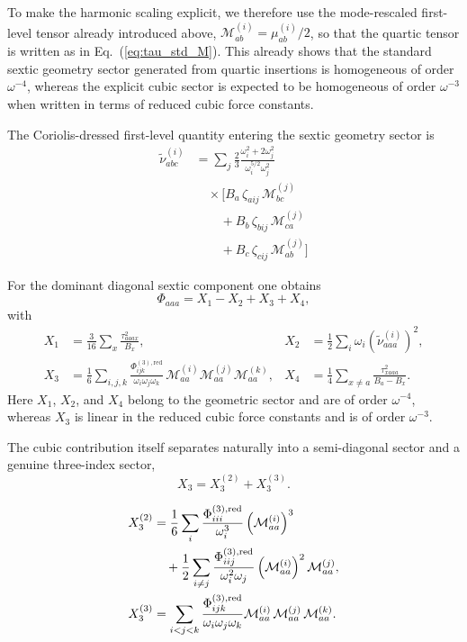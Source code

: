 \documentclass[aip,jcp,reprint,floatfix]{revtex4-2}
\begin{document}
To make the harmonic scaling explicit, we therefore use the
mode-rescaled first-level tensor already introduced above,
$\mathcal{M}^{(i)}_{ab}=\mu^{(i)}_{ab}/2$, so that the quartic tensor
is written as in Eq.~(\ref{eq:tau_std_M}). This already shows that the
standard sextic geometry sector generated
from quartic insertions is homogeneous of order $\omega^{-4}$, whereas
the explicit cubic sector is expected to be homogeneous of order
$\omega^{-3}$ when written in terms of reduced cubic force constants.

The Coriolis-dressed first-level quantity entering the sextic geometry
sector is
\begin{equation}
\begin{aligned}
\widetilde{\nu}^{(i)}_{abc}
&=
\sum_j
\frac{2}{3}
\frac{\omega_i^2+2\omega_j^2}{\omega_i^{5/2}\omega_j^2}
\\
&\quad \times
\Bigg[
B_a\,\zeta_{aij}\,\mathcal{M}^{(j)}_{bc}
\\
&\qquad
+ B_b\,\zeta_{bij}\,\mathcal{M}^{(j)}_{ca}
\\
&\qquad
+ B_c\,\zeta_{cij}\,\mathcal{M}^{(j)}_{ab}
\Bigg]
\end{aligned}
\end{equation}

For the dominant diagonal sextic component one obtains
\begin{equation}
\Phi_{aaa}=X_1-X_2+X_3+X_4,
\end{equation}
with
\begin{align}
X_1 &= \frac{3}{16}\sum_x\frac{\tau_{aaax}^2}{B_x},&
X_2 &= \frac{1}{2}\sum_i \omega_i\left(\widetilde{\nu}^{(i)}_{aaa}\right)^2,\\
X_3 &= \frac{1}{6}\sum_{i,j,k}
\frac{\Phi^{(3),\mathrm{red}}_{ijk}}{\omega_i\omega_j\omega_k}\,
\mathcal{M}^{(i)}_{aa}\mathcal{M}^{(j)}_{aa}\mathcal{M}^{(k)}_{aa},&
X_4 &= \frac{1}{4}\sum_{x\neq a}
\frac{\tau_{xaaa}^2}{B_a-B_x}.
\end{align}
Here $X_1$, $X_2$, and $X_4$ belong to the geometric sector and are of
order $\omega^{-4}$, whereas $X_3$ is linear in the reduced cubic force
constants and is of order $\omega^{-3}$.

The cubic contribution itself separates naturally into a semi-diagonal
sector and a genuine three-index sector,
\begin{equation}
X_3 = X_3^{(2)} + X_3^{(3)}.
\end{equation}

\begin{align}
X_3^{(2)}
&=
\frac{1}{6}\sum_i
\frac{\Phi^{(3),\mathrm{red}}_{iii}}{\omega_i^3}
\left(\mathcal{M}^{(i)}_{aa}\right)^3
\notag\\
&\quad
+ \frac{1}{2}\sum_{i\neq j}
\frac{\Phi^{(3),\mathrm{red}}_{iij}}{\omega_i^2\omega_j}
\left(\mathcal{M}^{(i)}_{aa}\right)^2
\mathcal{M}^{(j)}_{aa},
\\
X_3^{(3)}
&=
\sum_{i<j<k}
\frac{\Phi^{(3),\mathrm{red}}_{ijk}}{\omega_i\omega_j\omega_k}
\mathcal{M}^{(i)}_{aa}\,
\mathcal{M}^{(j)}_{aa}\,
\mathcal{M}^{(k)}_{aa}.
\end{align}
\end{document}
